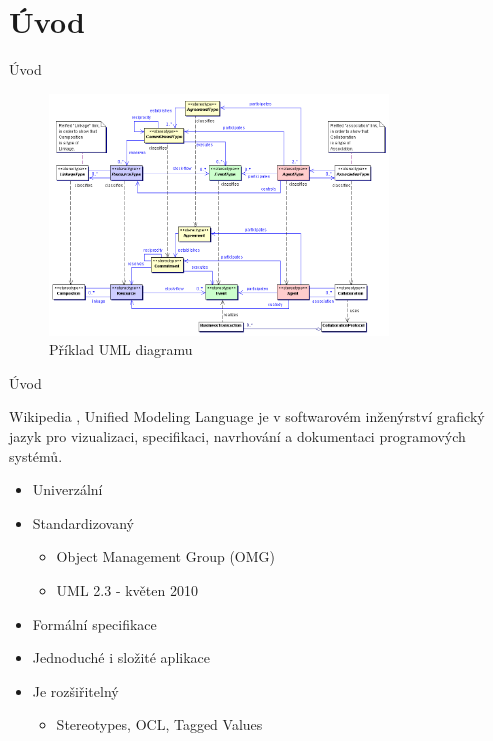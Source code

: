 \section{Úvod}



\begin{frame}{Úvod}

\begin{figure}
	\includegraphics[width=90mm]{img/uvodni_obrazek.png}
	\caption{Příklad UML diagramu}
\end{figure}
	
\end{frame}


\begin{frame}{Úvod}

\begin{block}{Wikipedia}
	, Unified Modeling Language je v softwarovém inženýrství 
	grafický jazyk pro vizualizaci, specifikaci, navrhování a 
	dokumentaci programových systémů. 
\end{block}

\pause

\begin{itemize}[<+->]
	\item Univerzální
	\item Standardizovaný
	\begin{itemize}[<+->]
		\item Object Management Group (OMG)
		\item UML 2.3 - květen 2010
	\end{itemize}
	\item Formální specifikace
	\item Jednoduché i složité aplikace
	\item Je rozšiřitelný
	\begin{itemize}[<+->]
		\item Stereotypes, OCL, Tagged Values
	\end{itemize}
\end{itemize}
	
\end{frame}

